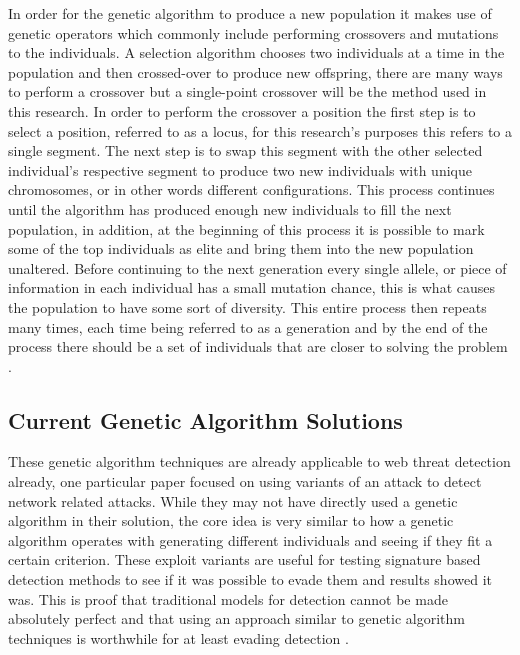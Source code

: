 In order for the genetic algorithm to produce a new population it makes use of genetic operators which commonly include performing crossovers and mutations to the individuals.  A selection algorithm chooses two individuals at a time in the population and then crossed-over to produce new offspring, there are many ways to perform a crossover but a single-point crossover will be the method used in this research.  In order to perform the crossover a position the first step is to select a position, referred to as a locus, for this research’s purposes this refers to a single segment.  The next step is to swap this segment with the other selected individual's respective segment to produce two new individuals with unique chromosomes, or in other words different configurations.  This process continues until the algorithm has produced enough new individuals to fill the next population, in addition, at the beginning of this process it is possible to mark some of the top individuals as elite and bring them into the new population unaltered.  Before continuing to the next generation every single allele, or piece of information in each individual has a small mutation chance, this is what causes the population to have some sort of diversity.  This entire process then repeats many times, each time being referred to as a generation and by the end of the process there should be a set of individuals that are closer to solving the problem \cite{matlabGenetic}.

\subsection{Current Genetic Algorithm Solutions} \label{sec:currentGenSolutions}

These genetic algorithm techniques are already applicable to web threat detection already, one particular paper focused on using variants of an attack to detect network related attacks.  While they may not have directly used a genetic algorithm in their solution, the core idea is very similar to how a genetic algorithm operates with generating different individuals and seeing if they fit a certain criterion.  These exploit variants are useful for testing signature based detection methods to see if it was possible to evade them and results showed it was.  This is proof that traditional models for detection cannot be made absolutely perfect and that using an approach similar to genetic algorithm techniques is worthwhile for at least evading detection \cite{testingNetworkBased}.

